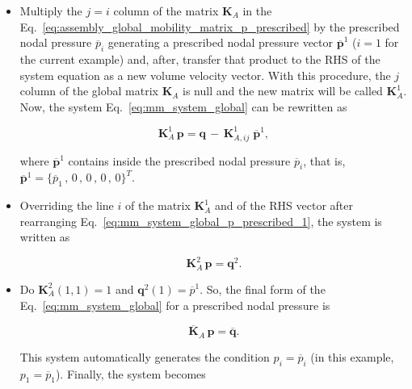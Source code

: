 \documentclass[12pt]{article}
\begin{document}
\begin{itemize}
	\item Multiply the $j=i$ column of the matrix $\mathbf{K}_{A}$ in the Eq.~\ref{eq:assembly_global_mobility_matrix_p_prescribed} by the prescribed nodal pressure $\overline{p}_i$ generating a prescribed nodal pressure vector $\mathbf{\overline{p}}^1$ ($i=1$ for the current example) and, after, transfer that product to the \acrshort{RHS} of the system equation as a new volume velocity vector. With this procedure, the $j$ column of the global matrix $\mathbf{K}_{A}$ is null and the new matrix will be called $\mathbf{K}_{A}^1$. Now, the system Eq.~\ref{eq:mm_system_global} can be rewritten as
	
	\begin{equation} \label{eq:mm_system_global_p_prescribed_1}
		\mathbf{K}_{A}^1 \, \mathbf{p} = \mathbf{q} \,  - \,  \mathbf{K}^1_{A,ij} \; \mathbf{\overline{p}}^1  ,
	\end{equation}{}
	
	\noindent where $\mathbf{\overline{p}}^1$ contains inside the prescribed nodal pressure $\overline{p}_i$, that is, $\mathbf{\overline{p}}^1 = \{ \overline{p}_1 \, , \, 0 \, , \, 0 \, , \, 0 \, , \, 0  \}^T$.
	
	\item Overriding the line $i$ of the matrix $\mathbf{K}_{A}^1$ and of the \acrshort{RHS} vector after rearranging Eq.~\ref{eq:mm_system_global_p_prescribed_1}, the system is written as
	
	\begin{equation} \label{eq:mm_system_global_p_prescribed_2}
		\mathbf{K}_{A}^2 \, \mathbf{p} = \mathbf{q}^2.
	\end{equation}{}
	
	\item Do  $\mathbf{K}_{A}^2(1,1) = 1$ and $\mathbf{q}^2(1) = \overline{p}^1 $. So, the final form of the Eq.~\ref{eq:mm_system_global} for a prescribed nodal pressure is
	
	\begin{equation} \label{eq:mm_system_global_p_prescribed_2}
		\mathbf{\overline{K}}_{A} \, \mathbf{p} = \mathbf{\overline{q}}.
	\end{equation}{}
	
	This system automatically generates the condition $p_i = \overline{p}_i$ (in this example, $p_1 = \overline{p}_1$). Finally, the system becomes
	

\end{itemize}
\end{document}
